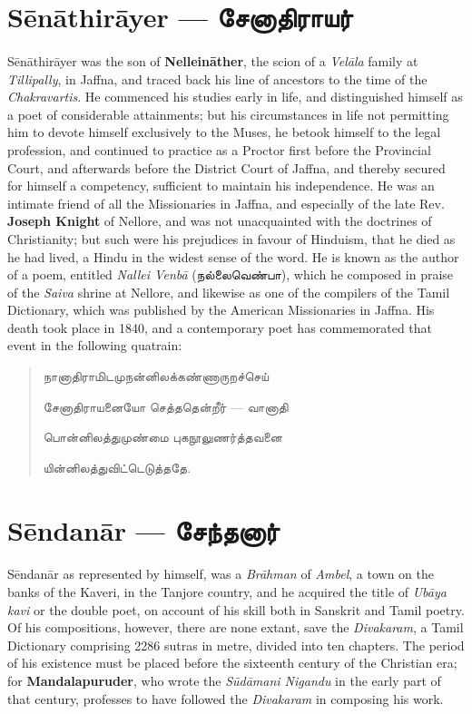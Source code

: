 \documentclass{article}
\newcommand{\TamilText}[1]{\texttamil{#1}}
\newcommand{\TamilBold}[1]{\texttamil{\textbf{#1}}}
\newcommand{\tam}[1]{\TamilText{#1}}
\newcommand{\tambold}[1]{\TamilBold{#1}}
\begin{document}
\section{S\={e}n\={a}thir\={a}yer --- \tambold{சேனாதிராயர்}}
\paragraph{}
S\={e}n\={a}thir\={a}yer was the son of \textbf{Nellein\={a}ther}, the scion of a \emph{Vel\={a}la} family at \emph{Tillipally}, in Jaffna, and traced back his line of ancestors to the time of the \emph{Chakravartis}. He commenced his studies early in life, and distinguished himself as a poet of considerable attainments; but his circumstances in life not permitting him to devote himself exclusively to the Muses, he betook himself to the legal profession, and continued to practice as a Proctor first before the Provincial Court, and afterwards before the District Court of Jaffna, and thereby secured for himself a competency, sufficient to maintain his independence. He was an intimate friend of all the Missionaries in Jaffna, and especially of the late Rev. \textbf{Joseph Knight} of Nellore, and was not unacquainted with the doctrines of Christianity; but such were his prejudices in favour of Hinduism, that he died as he had lived, a Hindu in the widest sense of the word. He is known as the author of a poem, entitled \emph{Nallei Venb\={a}} (\tam{நல்லைவெண்பா}), which he composed in praise of the \emph{Saiva} shrine at Nellore, and likewise as one of the compilers of the Tamil Dictionary, which was published by the American Missionaries in Jaffna. His death took place in 1840, and a contemporary poet has commemorated that event in the following quatrain:
\begin{quotation}\small
\tam{நானாதிராமிடமுநன்னிலக்கண்ணாருறச்செய்‌}

\tam{சேனாதிராயனையோ செத்ததென்றீர்} --- \tam{வானாதி}

\tam{பொன்னிலத்துமுண்மை புகநூலுணர்த்தவனை}

\tam{யின்னிலத்துவிட்டெடுத்ததே}.
\end{quotation}

\section{S\={e}ndan\={a}r --- \tambold{சேந்தனார்}}
\paragraph{}
S\={e}ndan\={a}r as represented by himself, was a \emph{Br\={a}hman} of \emph{Ambel}, a town on the banks of the Kaveri, in the Tanjore country, and he acquired the title of \emph{Ub\={a}ya kavi} or the double poet, on account of his skill both in Sanskrit and Tamil poetry. Of his compositions, however, there are none extant, save the \emph{Divakaram}, a Tamil Dictionary comprising 2286 sutras in metre, divided into ten chapters. The period of his existence must be placed before the sixteenth century of the Christian era; for \textbf{Mandalapuruder}, who wrote the \emph{S\={u}d\={a}mani Nigandu} in the early part of that century, professes to have followed the \emph{Divakaram} in composing his work.
\end{document}
